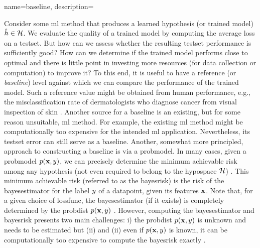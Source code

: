 {name={baseline},
    description={Consider some \gls{ml} method that produces a learned 
    	\gls{hypothesis} (or trained \gls{model}) $\learnthypothesis \in \hypospace$. We evaluate the quality of a trained \gls{model} 
    by computing the average \gls{loss} on a \gls{testset}. But how can we assess 
    whether the resulting \gls{testset} performance is sufficiently good? How can we 
    determine if the trained \gls{model} performs close to optimal and there is little point 
    in investing more resources (for \gls{data} collection or computation) to improve it? 
    To this end, it is useful to have a reference (or \emph{baseline}) level against which 
    we can compare the performance of the trained \gls{model}. Such a reference value 
    might be obtained from human performance, e.g., the misclassification rate of dermatologists 
    who diagnose cancer from visual inspection of skin \cite{SkinHumanAI}. Another source for a baseline is an existing, 
    but for some reason unsuitable, \gls{ml} method. For example, the existing \gls{ml} method 
    might be computationally too expensive for the intended \gls{ml} application. 
    Nevertheless, its \gls{testset} error can still serve as a baseline. Another, somewhat more principled, 
    approach to constructing a baseline is via a \gls{probmodel}. In many cases, given a \gls{probmodel} $p(\featurevec,\truelabel)$,  
    we can precisely determine the minimum achievable \gls{risk} among any \gls{hypothesis} 
    (not even required to belong to the \gls{hypospace} $\hypospace$) \cite{LC}. 
    This minimum achievable \gls{risk} (referred to as the \gls{bayesrisk}) is the \gls{risk} 
    of the \gls{bayesestimator} for the \gls{label} $\truelabel$ of a \gls{datapoint}, given
    its \gls{feature}s $\featurevec$. Note that, for a given choice of \gls{lossfunc}, the 
    \gls{bayesestimator} (if it exists) is completely determined by the \gls{probdist} $p(\featurevec,\truelabel)$ \cite[Chapter 4]{LC}. 
    However, computing the \gls{bayesestimator} and \gls{bayesrisk} presents two 
    main challenges: i) the \gls{probdist} $p(\featurevec,\truelabel)$ is unknown and 
    needs to be estimated but (ii) and (ii) even if $p(\featurevec,\truelabel)$ is known, 
    it can be computationally too expensive to compute the \gls{bayesrisk} exactly \cite{cooper1990computational}. 
	\begin{figure}[h]
		\begin{center}
		\begin{tikzpicture}

\end{tikzpicture}
\end{center}
\end{figure}}}
